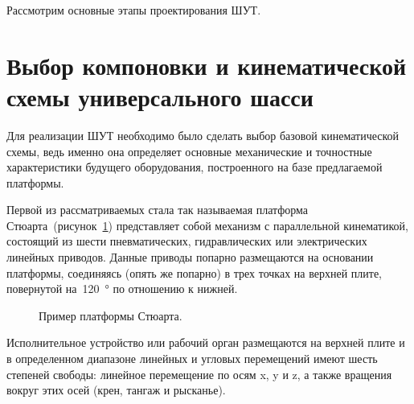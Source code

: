 Рассмотрим основные этапы проектирования ШУТ.

\section{Выбор компоновки и кинематической схемы универсального шасси}

Для реализации ШУТ необходимо было сделать выбор базовой кинематической схемы, ведь именно она определяет основные механические и точностные характеристики будущего оборудования, построенного на базе предлагаемой платформы.

Первой из рассматриваемых стала так называемая платформа Стюарта~(рисунок~\cref{fig:stuart}) представляет собой механизм с параллельной кинематикой, состоящий из шести пневматических, гидравлических или электрических линейных приводов. Данные приводы попарно размещаются на основании платформы, соединяясь (опять же попарно) в трех точках на верхней плите, повернутой на~\SI{120}{\degree} по отношению к нижней.

\begin{figure}[ht]
	\caption{Пример платформы Стюарта.}\label{fig:stuart}
\end{figure}

Исполнительное устройство или рабочий орган размещаются на верхней плите и в определенном диапазоне линейных и угловых перемещений имеют шесть степеней свободы: линейное перемещение по осям x, y и z, а также вращения вокруг этих осей (крен, тангаж и рысканье).

